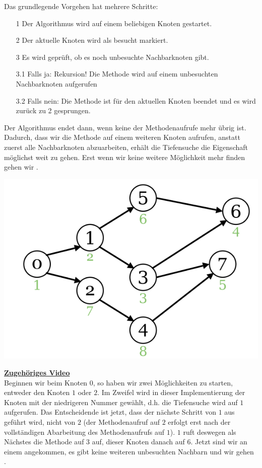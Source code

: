\documentclass{article}
\begin{document}
Das grundlegende Vorgehen hat mehrere Schritte:
\begin{enumerate}
    \item[1] Der Algorithmus wird auf einem beliebigen Knoten gestartet.
    \item[2] Der aktuelle Knoten wird als besucht markiert. 
    \item[3] Es wird geprüft, ob es noch unbesuchte Nachbarknoten gibt. 
    \item[3.1] Falls ja: Rekursion! Die Methode wird auf einem unbesuchten Nachbarknoten aufgerufen
    \item[3.2] Falls nein: Die Methode ist für den aktuellen Knoten beendet und es wird zurück zu 2 gesprungen.  
\end{enumerate}
Der Algorithmus endet dann, wenn keine der Methodenaufrufe mehr übrig ist. Dadurch, dass wir die Methode auf einem weiteren Knoten aufrufen, anstatt zuerst alle Nachbarknoten abzuarbeiten, erhält die Tiefensuche die Eigenschaft möglichst weit  zu gehen. Erst wenn wir keine weitere Möglichkeit mehr finden gehen wir .
\begin{center}
    \includegraphics[scale=0.35]{../../media/depth_search.png}
\end{center}
\href{https://youtu.be/nM9hBCUMXMA}{\textbf{Zugehöriges Video}}\\
Beginnen wir beim Knoten $0$, so haben wir zwei Möglichkeiten zu starten, entweder den Knoten $1$ oder $2$. Im Zweifel wird in dieser Implementierung der Knoten mit der niedrigeren Nummer gewählt, d.h. die Tiefensuche wird auf $1$ aufgerufen. Das Entscheidende ist jetzt, dass der nächste Schritt von $1$ aus geführt wird, nicht von $2$ (der Methodenaufruf auf $2$ erfolgt erst nach der vollständigen Abarbeitung des Methodenaufrufs auf $1$). $1$ ruft deswegen als Nächstes die Methode auf $3$ auf, dieser Knoten danach auf $6$. Jetzt sind wir an einem  angekommen, es gibt keine weiteren unbesuchten Nachbarn und wir gehen . \\
\end{document}
